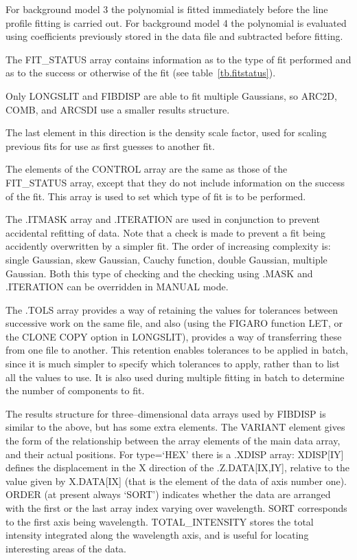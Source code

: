 \documentclass[11pt,twoside]{article}
\newcommand{\xref}[3]{#1}
\begin{document}
\normalsize
For background model 3 the polynomial is fitted immediately before the
line profile fitting is carried out.
For background model 4 the polynomial is evaluated using coefficients
previously stored in the data file and subtracted before fitting.


The FIT\_STATUS array contains information as to the type of fit
performed and as to the success or otherwise of the fit (see
table~\ref{tb.fitstatus}).

Only LONGSLIT and FIBDISP are able to fit multiple Gaussians, so ARC2D,
COMB, and ARCSDI use a smaller results structure.

The last element in this direction is the density scale factor, used for
scaling previous fits for use as first guesses to another fit.

The elements of the CONTROL array are the same as those of the
FIT\_STATUS array, except that they do not include information on the
success of the fit.
This array is used to set which type of fit is to be performed.

The .ITMASK array and .ITERATION are used in conjunction to prevent
accidental refitting of data.
Note that a check is made to prevent a fit being accidently
overwritten by a simpler fit.
The order of increasing complexity is: single Gaussian, skew
Gaussian, Cauchy function, double Gaussian, multiple Gaussian.
Both this type of checking and the checking using .MASK and .ITERATION
can be overridden in MANUAL mode.

The .TOLS array provides a way of retaining the values for tolerances
between successive work on the same file, and also (using the \xref{FIGARO}{sun86}{}
function LET, or the CLONE COPY option in LONGSLIT), provides a way of
transferring these from one file to another.
This retention enables tolerances to be applied in batch, since it is
much simpler to specify which tolerances to apply, rather than to list
all the values to use.
It is also used during multiple fitting in batch to determine the number
of components to fit.

The results structure for three--dimensional data arrays used by FIBDISP
is similar to the above, but has some extra elements.
The VARIANT element gives the form of the relationship between the array
elements of the main data array, and their actual positions.
For type=`HEX' there is a .XDISP array: XDISP[IY] defines the
displacement in the X direction of the .Z.DATA[IX,IY], relative to the
value given by X.DATA[IX] (that is the element of the data of axis
number one).
ORDER (at present always `SORT') indicates whether the data are
arranged with the first or the last array index varying over wavelength.
SORT corresponds to the first axis being wavelength.
TOTAL\_INTENSITY stores the total intensity integrated along the
wavelength axis, and is useful for locating interesting areas of the
data.
\end{document}
